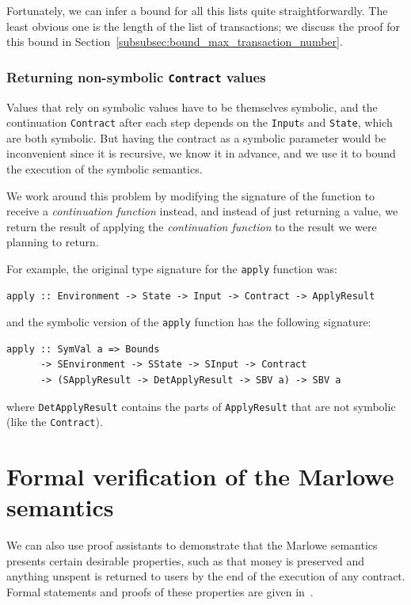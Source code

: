 \documentclass[runningheads]{llncs}
\begin{document}
Fortunately, we can infer a bound for all this lists quite straightforwardly. The least obvious one is the length of the list of transactions; we discuss the proof for this bound in Section~\ref{subsubsec:bound_max_transaction_number}.

\subsubsection{Returning non-symbolic \texttt{Contract} values}

Values that rely on symbolic values have to be themselves symbolic, and the continuation \texttt{Contract} after each step depends on the \texttt{Input}s and \texttt{State}, which are both symbolic. But having the contract as a symbolic parameter would be inconvenient since it is recursive, we know it in advance, and we use it to bound the execution of the symbolic semantics.

We work around this problem by modifying the signature of the function to receive a \textit{continuation function} instead, and instead of just returning a value, we return the result of applying the \textit{continuation function} to the result we were planning to return.

For example, the original type signature for the \texttt{apply} function was:

\begin{verbatim}
apply :: Environment -> State -> Input -> Contract -> ApplyResult
\end{verbatim}

\noindent
and the symbolic version of the \texttt{apply} function has the following signature:

\begin{verbatim}
apply :: SymVal a => Bounds
      -> SEnvironment -> SState -> SInput -> Contract
      -> (SApplyResult -> DetApplyResult -> SBV a) -> SBV a
\end{verbatim}

\noindent
where \texttt{DetApplyResult} contains the parts of \texttt{ApplyResult} that are not symbolic (like the \texttt{Contract}).

\section{Formal verification of the Marlowe semantics\label{sec:verification}}

We can also use proof assistants to demonstrate that the Marlowe semantics presents certain desirable properties, such as that money is preserved and anything unspent is returned to users by the end of the execution of any contract. Formal statements and proofs of these properties are given in~\cite{marlowe-github}.
\end{document}
